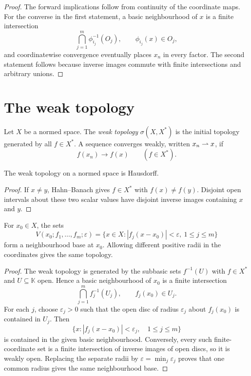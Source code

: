 \begin{proof}
The forward implications follow from continuity of the coordinate maps.  For
the converse in the first statement, a basic neighbourhood of $x$ is a finite
intersection
\[
  \bigcap_{j=1}^m\phi_{i_j}^{-1}(O_j),
  \qquad \phi_{i_j}(x)\in O_j,
\]
and coordinatewise convergence eventually places $x_n$ in every factor.  The
second statement follows because inverse images commute with finite
intersections and arbitrary unions.
\end{proof}

\section{The weak topology}

\begin{notedefinition}
Let $X$ be a normed space.  The \emph{weak topology} $\sigma(X,X^*)$ is the
initial topology generated by all $f\in X^*$.  A sequence converges weakly,
written $x_n\rightharpoonup x$, if
\[
  f(x_n)\longrightarrow f(x)
  \qquad(f\in X^*).
\]
\end{notedefinition}

\begin{notetheorem}
The weak topology on a normed space is Hausdorff.
\end{notetheorem}

\begin{proof}
If $x\ne y$, Hahn--Banach gives $f\in X^*$ with $f(x)\ne f(y)$.  Disjoint
open intervals about these two scalar values have disjoint inverse images
containing $x$ and $y$.
\end{proof}

\begin{noteproposition}
For $x_0\in X$, the sets
\[
  V(x_0;f_1,\ldots,f_m;\varepsilon)
  =\{x\in X:|f_j(x-x_0)|<\varepsilon,
                    \ 1\le j\le m\}
\]
form a neighbourhood base at $x_0$.  Allowing different positive radii in the
coordinates gives the same topology.
\end{noteproposition}

\begin{proof}
The weak topology is generated by the subbasic sets $f^{-1}(U)$ with
$f\in X^*$ and $U\subseteq\mathbb K$ open.  Hence a basic neighbourhood of
$x_0$ is a finite intersection
\[
  \bigcap_{j=1}^m f_j^{-1}(U_j),
  \qquad f_j(x_0)\in U_j.
\]
For each $j$, choose $\varepsilon_j>0$ such that the open disc of radius
$\varepsilon_j$ about $f_j(x_0)$ is contained in $U_j$.  Then
\[
  \{x:|f_j(x-x_0)|<\varepsilon_j,\quad 1\le j\le m\}
\]
is contained in the given basic neighbourhood.  Conversely, every such
finite-coordinate set is a finite intersection of inverse images of open
discs, so it is weakly open.  Replacing the separate radii by
$\varepsilon=\min_j\varepsilon_j$ proves that one common radius gives the
same neighbourhood base.
\end{proof}

